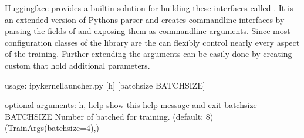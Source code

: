 \documentclass[letterpaper,10pt,english]{jupyterBook}
\begin{document}
\sphinxAtStartPar
Huggingface provides a built\sphinxhyphen{}in solution for building these interfaces called .
It is an extended version of Pythons  parser and creates command\sphinxhyphen{}line interfaces by parsing the fields of  and exposing them as command\sphinxhyphen{}line arguments.
Since most configuration classes of the  library are  the  can flexibly control nearly every aspect of the training.
Further extending the arguments can be easily done by creating custom  that hold additional parameters.
\begin{sphinxVerbatimInput}

\begin{sphinxVerbatim}[commandchars=\\\{\}]
    
   

 
       
          
           

  
  \PYG{p}{[} \PYG{p}{]}
\end{sphinxVerbatim}
\end{sphinxVerbatimInput}
\begin{sphinxVerbatimOutput}

\begin{sphinxVerbatim}[commandchars=\\\{\}]
usage: ipykernel\PYGZus{}launcher.py [\PYGZhy{}h] [\PYGZhy{}\PYGZhy{}batch\PYGZus{}size BATCH\PYGZus{}SIZE]

optional arguments:
  \PYGZhy{}h, \PYGZhy{}\PYGZhy{}help            show this help message and exit
  \PYGZhy{}\PYGZhy{}batch\PYGZus{}size BATCH\PYGZus{}SIZE
                        Number of batched for training. (default: 8)
(TrainArgs(batch\PYGZus{}size=4),)
\end{sphinxVerbatim}
\end{sphinxVerbatimOutput}
\end{document}
